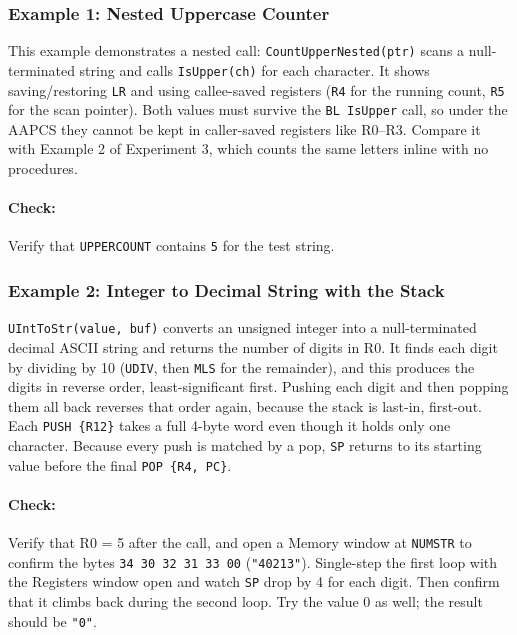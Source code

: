 \subsubsection{Example 1: Nested Uppercase Counter}
This example demonstrates a nested call: \texttt{CountUpperNested(ptr)} scans a null-terminated string and calls \texttt{IsUpper(ch)} for each character. It shows saving/restoring \texttt{LR} and using callee-saved registers (\texttt{R4} for the running count, \texttt{R5} for the scan pointer). Both values must survive the \texttt{BL IsUpper} call, so under the AAPCS they cannot be kept in caller-saved registers like R0--R3. Compare it with Example 2 of Experiment 3, which counts the same letters inline with no procedures.

\paragraph{Check:} Verify that \texttt{UPPERCOUNT} contains \texttt{5} for the test string.

\newpage
\subsubsection{Example 2: Integer to Decimal String with the Stack}
\texttt{UIntToStr(value, buf)} converts an unsigned integer into a null-terminated decimal ASCII string and returns the number of digits in R0. It finds each digit by dividing by 10 (\texttt{UDIV}, then \texttt{MLS} for the remainder), and this produces the digits in reverse order, least-significant first. Pushing each digit and then popping them all back reverses that order again, because the stack is last-in, first-out. Each \texttt{PUSH \{R12\}} takes a full 4-byte word even though it holds only one character. Because every push is matched by a pop, \texttt{SP} returns to its starting value before the final \texttt{POP \{R4, PC\}}.

\paragraph{Check:} Verify that R0 = 5 after the call, and open a Memory window at \texttt{NUMSTR} to confirm the bytes \texttt{34 30 32 31 33 00} (\texttt{"40213"}). Single-step the first loop with the Registers window open and watch \texttt{SP} drop by 4 for each digit. Then confirm that it climbs back during the second loop. Try the value 0 as well; the result should be \texttt{"0"}.

